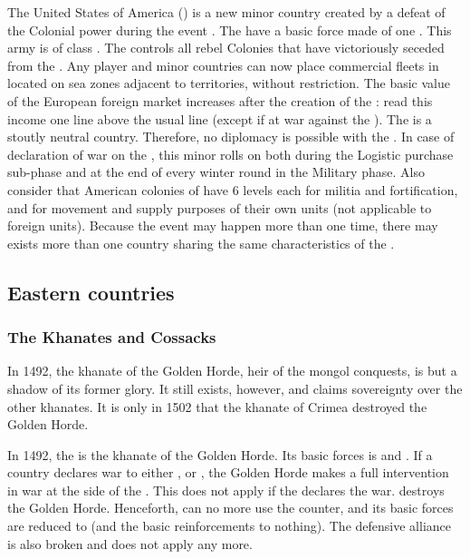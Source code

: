 \label{chSpecific:USA}
\aparag The United States of America () is a new minor country
created by a defeat of the Colonial power during the event
.
The  have a basic force made of one \ARMY\faceplus.  This army
is of class \CAIV.
\aparag The  controls all rebel Colonies that have
victoriously seceded from the \MAJ.
\aparag
Any player and minor countries can now place commercial fleets in \STZ
located on sea zones adjacent to  territories, without
restriction.
\aparag The basic value of the European foreign market increases after
the creation of the : read this income one line above the
usual line (except if at war against the ).
\aparag The  is a stoutly neutral country. Therefore, no
diplomacy is possible with the .
In case of declaration of war on the , this minor rolls on
 both during the Logistic purchase
sub-phase and at the end of every winter round in the Military phase.
\bparag Also consider that American colonies of  have 6
levels each for militia and fortification, and for movement and supply
purposes of their own units (not applicable to foreign units).
Because the event may happen more than one time, there may exists more
than one country sharing the same characteristics of the .

\subsection{Eastern countries}

\subsubsection{The Khanates and Cossacks}
\begin{histoire}
  In 1492, the khanate of the Golden Horde, heir of the mongol
  conquests, is but a shadow of its former glory. It still exists,
  however, and claims sovereignty over the other khanates. It is only in
  1502 that the khanate of Crimea destroyed the Golden Horde.
\end{histoire}
 \hfill {}
\bparag In 1492, the  is the khanate of the Golden
Horde. Its basic forces is \ARMY\faceplus and \LD.
\bparag If a country declares war to either ,
 or , the Golden Horde makes a full
intervention in war at the side of the \MIN. This does not apply if the
\MIN declares the war.
\bparag {} destroys the Golden
Horde. Henceforth,  can no more use the \ARMY counter, and
its basic forces are reduced to \LD (and the basic reinforcements to
nothing). The defensive alliance is also broken and does not apply any
more.


